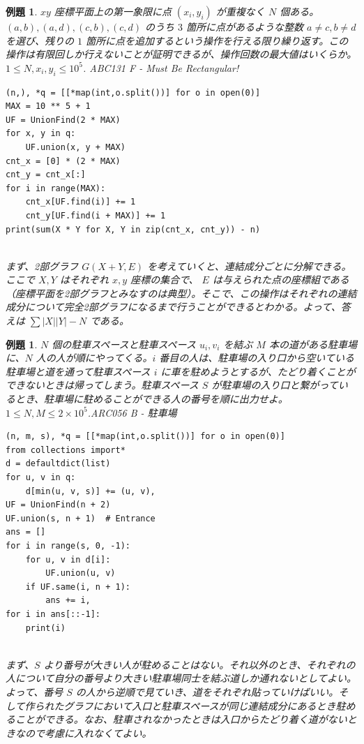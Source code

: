 \documentclass[12pt, a4j]{ltjsarticle}
\newtheorem{exm}[thm]{例題}
\newcommand*{\SS}{\vspace{1cm}}
\begin{document}
\SS

\begin{exm} $xy$ 座標平面上の第一象限に点 $(x_i,y_i)$ が重複なく $N$ 個ある。$(a, b), (a, d), (c, b), (c, d)$ のうち $3$ 箇所に点があるような整数 $a\ne c, b\ne d$ を選び、残りの $1$ 箇所に点を追加するという操作を行える限り繰り返す。この操作は有限回しか行えないことが証明できるが、操作回数の最大値はいくらか。$1\le N,x_i,y_i\le 10^5$. \upshape\quad ABC131 F - Must Be Rectangular!\\
\begin{lstlisting}
(n,), *q = [[*map(int,o.split())] for o in open(0)]
MAX = 10 ** 5 + 1
UF = UnionFind(2 * MAX)
for x, y in q:
    UF.union(x, y + MAX)
cnt_x = [0] * (2 * MAX)
cnt_y = cnt_x[:]
for i in range(MAX):
    cnt_x[UF.find(i)] += 1
    cnt_y[UF.find(i + MAX)] += 1
print(sum(X * Y for X, Y in zip(cnt_x, cnt_y)) - n)
\end{lstlisting}\quad\\
まず、2部グラフ $G(X+Y,E)$ を考えていくと、連結成分ごとに分解できる。ここで $X,Y$ はそれぞれ $x,y$ 座標の集合で、 $E$ は与えられた点の座標組である（座標平面を2部グラフとみなすのは典型）。そこで、この操作はそれぞれの連結成分について完全2部グラフになるまで行うことができるとわかる。よって、答えは $\sum |X||Y| - N$ である。
\end{exm}

\SS

\begin{exm} $N$ 個の駐車スペースと駐車スペース $u_i,v_i$ を結ぶ $M$ 本の道がある駐車場に、$N$ 人の人が順にやってくる。$i$ 番目の人は、駐車場の入り口から空いている駐車場と道を通って駐車スペース $i$ に車を駐めようとするが、たどり着くことができないときは帰ってしまう。駐車スペース $S$ が駐車場の入り口と繋がっているとき、駐車場に駐めることができる人の番号を順に出力せよ。$1\le N,M\le 2\times 10^5$.\quad\upshape ARC056 B - 駐車場\\
\begin{lstlisting}
(n, m, s), *q = [[*map(int,o.split())] for o in open(0)]
from collections import*
d = defaultdict(list)
for u, v in q:
    d[min(u, v, s)] += (u, v),
UF = UnionFind(n + 2)
UF.union(s, n + 1)  # Entrance
ans = []
for i in range(s, 0, -1):
    for u, v in d[i]:
        UF.union(u, v)
    if UF.same(i, n + 1):
        ans += i,
for i in ans[::-1]:
    print(i)
\end{lstlisting}\quad\\
まず、$S$ より番号が大きい人が駐めることはない。それ以外のとき、それぞれの人について自分の番号より大きい駐車場同士を結ぶ道しか通れないとしてよい。よって、番号 $S$ の人から逆順で見ていき、道をそれぞれ貼っていけばいい。そして作られたグラフにおいて入口と駐車スペースが同じ連結成分にあるとき駐めることができる。なお、駐車されなかったときは入口からたどり着く道がないときなので考慮に入れなくてよい。
\end{exm}
\end{document}
